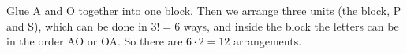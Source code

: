 Glue A and O together into one block. Then we arrange three units (the block, P and S), which can be done in $3!=6$ ways, and inside the block the letters can be in the order AO or OA. So there are $6\cdot2=\boxed{12}$ arrangements.
